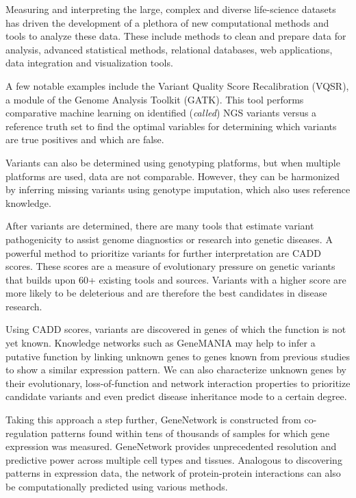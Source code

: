Measuring and interpreting the large, complex and diverse life-science datasets has driven the development of a plethora of new computational methods and tools to analyze these data.
These include methods to clean and prepare data for analysis, advanced statistical methods, relational databases, web applications, data integration and visualization tools.

A few notable examples include the Variant Quality Score Recalibration (VQSR), a module of the Genome Analysis Toolkit (GATK)\cite{Van_der_Auwera_2013}.
This tool performs comparative machine learning on identified (\textsl{called}) NGS variants versus a reference truth set to find the optimal variables for determining which variants are true positives and which are false.

Variants can also be determined using genotyping platforms, but when multiple platforms are used, data are not comparable.
However, they can be harmonized by inferring missing variants using genotype imputation\cite{Deelen_2014}, which also uses reference knowledge.

After variants are determined, there are many tools that estimate variant pathogenicity to assist genome diagnostics or research into genetic diseases\cite{Eilbeck_2017}.
A powerful method to prioritize variants for further interpretation are CADD scores\cite{Kircher_2014}.
These scores are a measure of evolutionary pressure on genetic variants that builds upon 60+ existing tools and sources.
Variants with a higher score are more likely to be deleterious and are therefore the best candidates in disease research.

Using CADD scores, variants are discovered in genes of which the function is not yet known.
Knowledge net\-works such as Gene\-MA\-NIA\cite{Warde_Farley_2010} may help to infer a putative function by linking unknown genes to genes known from previous studies to show a similar expression pattern.
We can also characterize unknown genes by their evolutionary, loss-of-function and network interaction properties to prioritize candidate variants\cite{Khurana_2013} and even predict disease inheritance mode to a certain degree\cite{Hsu_2016}.

Taking this approach a step further, GeneNetwork\cite{Fehrmann_2015} is constructed from co-regulation patterns found within tens of thousands of samples for which gene expression was measured.
GeneNetwork provides unprecedented resolution and predictive power across multiple cell types and tissues.
Analogous to discovering patterns in expression data, the network of protein-protein interactions can also be computationally predicted using various methods\cite{Zahiri_2013}.

